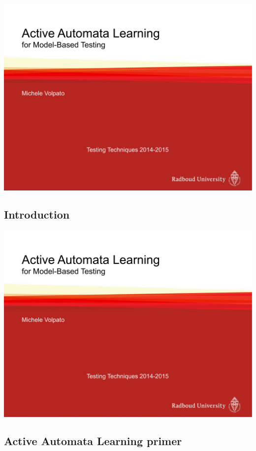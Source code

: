 \includegraphics[page=7,scale=0.25,trim={0 10cm 0 0},clip]{slides/learningmealy.pdf}

\subsection{Introduction}

\includegraphics[page=21,scale=0.25,trim={0 5cm 0 0},clip]{slides/learningmealy.pdf}

\subsection{Active Automata Learning primer}

